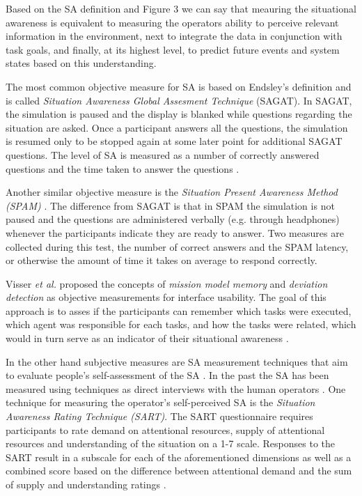 \documentclass[12pt, letterpaper, oneside]{article}
\begin{document}
Based on the SA definition and Figure 3 we can say that meauring the situational awareness is equivalent to measuring the operators ability to perceive relevant information in
the environment, next to integrate the data in conjunction with task goals, and finally, at its
highest level, to predict future events and system states based on this understanding.

The most common objective measure for SA is based on Endsley's definition and is called \emph{Situation Awareness Global Assesment Technique} (SAGAT). In SAGAT, the simulation is paused and the display is blanked while questions regarding the situation are asked. Once a participant answers all the questions, the simulation is resumed only to be stopped again at some later point for additional SAGAT questions. The level of SA is measured as a number of correctly answered questions and the time taken to answer the questions \cite{34}. 

Another similar objective measure is the \emph{Situation Present Awareness Method (SPAM)} \cite{35}. The difference from SAGAT is that in SPAM the simulation is not paused and the questions are administered verbally (e.g. through headphones) whenever the participants indicate they are ready to answer. Two measures are collected during this test, the number of correct answers and the SPAM latency, or otherwise the amount of time it takes on average to respond correctly.   

Visser \emph{et al.} proposed the concepts of \emph{mission model memory} and \emph{deviation detection} as objective measurements for interface usability. The goal of this approach is to asses if the participants can remember which tasks were executed, which agent was responsible for each tasks, and how the tasks were related, which would in turn serve as an indicator of their situational awareness \cite{6}. 

In the other hand subjective measures are SA measurement techniques that aim to evaluate people's self-assessment of the SA \cite{12}. In the past the SA has been measured using techniques as direct interviews with the human operators \cite{7}. One technique for measuring the operator's self-perceived SA is the \emph{Situation Awareness Rating Technique (SART)}. The SART questionnaire requires participants to rate demand on attentional resources, supply of attentional resources and understanding of the situation on a 1-7 scale. Responses to the SART result in a subscale for each of the aforementioned dimensions as well as a combined score based on the difference between attentional demand and the sum of supply and understanding ratings \cite{36}. 
\end{document}
